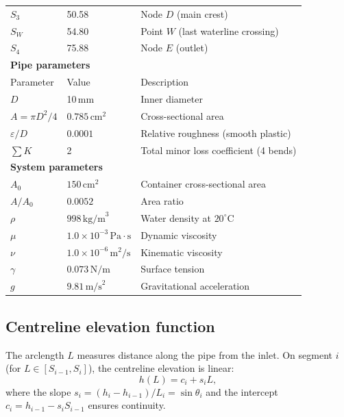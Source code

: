 \documentclass[11pt]{article}
\begin{document}
\begin{table}[H]
\begin{tabular}{llll}
$S_3$ & 50.58 & \multicolumn{2}{l}{Node $D$ (main crest)} \\
$S_W$ & 54.80 & \multicolumn{2}{l}{Point $W$ (last waterline crossing)} \\
$S_4$ & 75.88 & \multicolumn{2}{l}{Node $E$ (outlet)} \\
\midrule
\multicolumn{4}{l}{\textbf{Pipe parameters}} \\
\midrule
Parameter & Value & \multicolumn{2}{l}{Description} \\
\midrule
$D$ & 10\,mm & \multicolumn{2}{l}{Inner diameter} \\
$A = \pi D^2/4$ & $0.785\,\text{cm}^2$ & \multicolumn{2}{l}{Cross-sectional area} \\
$\varepsilon/D$ & $0.0001$ & \multicolumn{2}{l}{Relative roughness (smooth plastic)} \\
$\sum K$ & 2 & \multicolumn{2}{l}{Total minor loss coefficient (4 bends)} \\
\midrule
\multicolumn{4}{l}{\textbf{System parameters}} \\
\midrule
$A_0$ & $150\,\text{cm}^2$ & \multicolumn{2}{l}{Container cross-sectional area} \\
$A/A_0$ & $0.0052$ & \multicolumn{2}{l}{Area ratio} \\
$\rho$ & $998\,\text{kg/m}^3$ & \multicolumn{2}{l}{Water density at $20^\circ$C} \\
$\mu$ & $1.0 \times 10^{-3}\,\text{Pa}\cdot\text{s}$ & \multicolumn{2}{l}{Dynamic viscosity} \\
$\nu$ & $1.0 \times 10^{-6}\,\text{m}^2/\text{s}$ & \multicolumn{2}{l}{Kinematic viscosity} \\
$\gamma$ & $0.073\,\text{N/m}$ & \multicolumn{2}{l}{Surface tension} \\
$g$ & $9.81\,\text{m/s}^2$ & \multicolumn{2}{l}{Gravitational acceleration} \\
\bottomrule
\end{tabular}
\end{table}

\subsection{Centreline elevation function}

The arclength $L$ measures distance along the pipe from the inlet. On segment $i$ (for $L \in [S_{i-1}, S_i]$), the centreline elevation is linear:
\begin{equation}
  h(L) = c_i + s_i L,
  \label{eq:hL-piecewise}
\end{equation}
where the slope $s_i = (h_i - h_{i-1})/L_i = \sin\theta_i$ and the intercept $c_i = h_{i-1} - s_i S_{i-1}$ ensures continuity.
\end{document}
